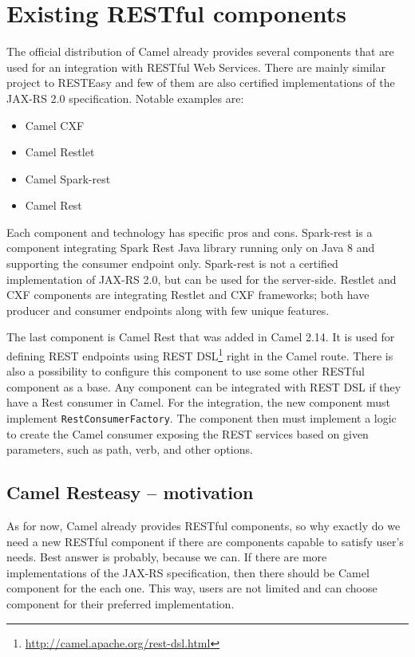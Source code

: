 \documentclass[12pt,final,oneside]{fithesis2}
\begin{document}


\section{Existing RESTful components}
The official distribution of Camel already provides several components that are used for an integration with RESTful Web Services. There are mainly similar project to RESTEasy and few of them are also certified implementations of the JAX-RS 2.0 specification. Notable examples are:
\begin{itemize}
\item
Camel CXF

\item
Camel Restlet

\item
Camel Spark-rest

\item
Camel Rest
\end{itemize}

Each component and technology has specific pros and cons. Spark-rest is a component integrating Spark Rest Java library running only on Java 8 and supporting the consumer endpoint only. Spark-rest is not a certified implementation of JAX-RS 2.0, but can be used for the server-side. Restlet and CXF components are integrating Restlet and CXF frameworks; both have producer and consumer endpoints along with few unique features. 

The last component is Camel Rest that was added in Camel 2.14. It is used for defining REST endpoints using REST DSL\footnote{\url{http://camel.apache.org/rest-dsl.html}} right in the Camel route. There is also a possibility to configure this component to use some other RESTful component as a base. Any component can be integrated with REST DSL if they have a Rest consumer in Camel. For the integration, the new component must implement \texttt{RestConsumerFactory}. The component then must implement a logic to create the Camel consumer exposing the REST services based on given parameters, such as path, verb, and other options.

\subsection{Camel Resteasy -- motivation}
As for now, Camel already provides RESTful components, so why exactly do we need a new RESTful component if there are components capable to satisfy user's needs. Best answer is probably, because we can. If there are more implementations of the JAX-RS specification, then there should be Camel component for the each one. This way, users are not limited and can choose component for their preferred implementation. 
\end{document}
